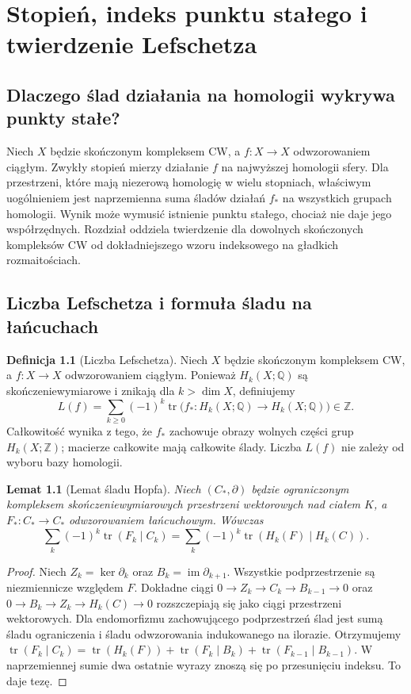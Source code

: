 \documentclass[11pt,a4paper,oneside]{report}
\newcommand{\Z}{\mathbb{Z}}
\newcommand{\Q}{\mathbb{Q}}
\theoremstyle{plain}
\newtheorem{lemat}[twierdzenie]{Lemat}
\theoremstyle{definition}
\newtheorem{definicja}[twierdzenie]{Definicja}
\theoremstyle{remark}
\begin{document}
\chapter{Stopień, indeks punktu stałego i twierdzenie Lefschetza}
\label{ch:lefschetz-v10}

\section{Dlaczego ślad działania na homologii wykrywa punkty stałe?}
Niech $X$ będzie skończonym kompleksem CW, a $f:X\to X$
odwzorowaniem ciągłym. Zwykły stopień mierzy działanie
$f$ na najwyższej homologii sfery. Dla przestrzeni, które
mają niezerową homologię w wielu stopniach, właściwym
uogólnieniem jest naprzemienna suma śladów działań
$f_*$ na wszystkich grupach homologii. Wynik może wymusić
istnienie punktu stałego, chociaż nie daje jego współrzędnych.
Rozdział oddziela twierdzenie dla dowolnych skończonych
kompleksów CW od dokładniejszego wzoru indeksowego na
gładkich rozmaitościach.

\section{Liczba Lefschetza i formuła śladu na łańcuchach}
\begin{definicja}[Liczba Lefschetza]
Niech $X$ będzie skończonym kompleksem CW, a $f:X\to X$
odwzorowaniem ciągłym. Ponieważ $H_k(X;\Q)$ są
skończeniewymiarowe i znikają dla $k>\dim X$, definiujemy
\[
 L(f)=\sum_{k\ge0}(-1)^k\operatorname{tr}
 \bigl(f_*:H_k(X;\Q)\to H_k(X;\Q)\bigr)\in\Z.
\]
Całkowitość wynika z tego, że $f_*$ zachowuje obrazy
wolnych części grup $H_k(X;\Z)$; macierze całkowite
mają całkowite ślady. Liczba $L(f)$ nie zależy od
wyboru bazy homologii.
\end{definicja}

\begin{lemat}[Lemat śladu Hopfa]
\label{lem:hopf-trace-v10}
Niech $(C_*,\partial)$ będzie ograniczonym kompleksem
skończeniewymiarowych przestrzeni wektorowych nad ciałem
$K$, a $F_*:C_*\to C_*$ odwzorowaniem łańcuchowym.
Wówczas
\[
 \sum_k(-1)^k\operatorname{tr}(F_k\mid C_k)
 =\sum_k(-1)^k\operatorname{tr}(H_k(F)\mid H_k(C)).
\]
\end{lemat}
\begin{proof}
Niech $Z_k=\ker\partial_k$ oraz $B_k=\operatorname{im}\partial_{k+1}$.
Wszystkie podprzestrzenie są niezmiennicze względem $F$.
Dokładne ciągi
$0\to Z_k\to C_k\to B_{k-1}\to0$ oraz
$0\to B_k\to Z_k\to H_k(C)\to0$
rozszczepiają się jako ciągi przestrzeni wektorowych.
Dla endomorfizmu zachowującego podprzestrzeń ślad jest
sumą śladu ograniczenia i śladu odwzorowania indukowanego
na ilorazie. Otrzymujemy
$\operatorname{tr}(F_k\mid C_k)=
 \operatorname{tr}(H_k(F))+
 \operatorname{tr}(F_k\mid B_k)+
 \operatorname{tr}(F_{k-1}\mid B_{k-1})$.
W naprzemiennej sumie dwa ostatnie wyrazy znoszą się
po przesunięciu indeksu. To daje tezę.
\end{proof}
\end{document}
